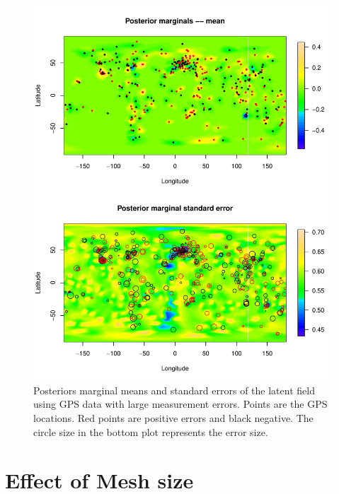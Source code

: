 \documentclass[a4paper,12pt]{article}
\begin{document}
 \begin{figure}[htbp]
 \begin{center}
 \includegraphics[scale=0.8]{fig/sMesh_LErr_GIAfield.pdf}
 \end{center}
 \caption[Posterior marginals of the latent field]{Posteriors marginal means and standard errors of the latent field using GPS data with large measurement errors. Points are the GPS locations. Red points are positive errors and black negative. The circle size in the bottom plot represents the error size.}
 \label{fig:4}
 \end{figure}
 
 \newpage
 
\section{Effect of Mesh size}
\end{document}
